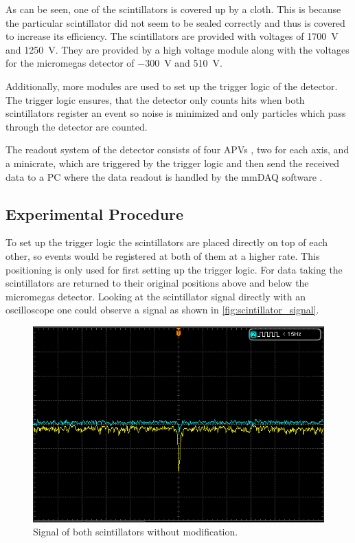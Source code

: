 \documentclass[sn-mathphys-num,iicol]{sn-jnl}
\theoremstyle{thmstyleone}
\theoremstyle{thmstyletwo}
\theoremstyle{thmstylethree}
\begin{document}
As can be seen, one of the scintillators is covered up by a cloth. 
This is because the particular scintillator did not seem to be sealed correctly and thus is covered to increase its efficiency.
The scintillators are provided with voltages of \SI{1700}{\volt} and \SI{1250}{\volt}. 
They are provided by a high voltage module \cite{Micromega} along with the voltages for the micromegas detector of \SI{-300}{\volt} and \SI{510}{\volt}.

Additionally, more modules \cite{Micromega} are used to set up the trigger logic of the detector.
The trigger logic ensures, that the detector only counts hits when both scintillators register an event so noise is minimized and only particles which pass through the detector are counted.

The readout system of the detector consists of four APVs \cite{APV}, two for each axis, and a minicrate, which are triggered by the trigger logic and then send the received data to a PC where the data readout is handled by the mmDAQ software \cite{mmDAQ}.


\subsection{Experimental Procedure}
To set up the trigger logic the scintillators are placed directly on top of each other, so events would be registered at both of them at a higher rate.
This positioning is only used for first setting up the trigger logic.
For data taking the scintillators are returned to their original positions above and below the micromegas detector.
Looking at the scintillator signal directly with an oscilloscope one could observe a signal as shown in \autoref{fig:scintillator_signal}.

\begin{figure}
  \includegraphics[width=\linewidth]{figures/DS1Z_QuickPrint5_cropped.png}
  \caption{Signal of both scintillators without modification.}
  \label{fig:scintillator_signal}
\end{figure}
\end{document}
